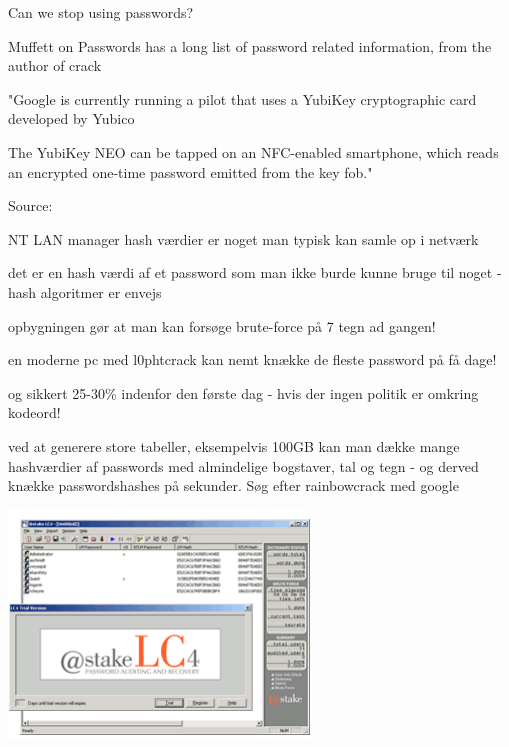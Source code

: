 \documentclass[20pt,landscape,a4paper,footrule]{foils}
\begin{document}


Can we stop using passwords?

Muffett on Passwords has a long list of password related information, from the author of crack 






"Google is currently running a pilot that uses a YubiKey cryptographic card developed by Yubico

The YubiKey NEO can be tapped on an NFC-enabled smartphone, which reads an encrypted one-time password emitted from the key fob."

Source:\\
{\footnotesize {}
}



\begin{list1}
  \item NT LAN manager hash værdier er noget man typisk kan samle op i
  netværk
\item det er en hash værdi af et password som man ikke burde kunne
  bruge til noget - hash algoritmer er envejs
\item opbygningen gør at man kan forsøge brute-force på 7 tegn ad
  gangen!
\item en moderne pc med l0phtcrack kan nemt knække de fleste password
  på få dage!
\item og sikkert 25-30\% indenfor den første dag - hvis der ingen
  politik er omkring kodeord!
\item ved at generere store tabeller, eksempelvis 100GB kan man dække
  mange hashværdier af passwords med almindelige bogstaver, tal og
  tegn - og derved knække passwordshashes på sekunder. Søg efter
  rainbowcrack med google
\end{list1}

\begin{center}
\colorbox{white}{\includegraphics[width=8cm]{images/lc4_splash.png}}
\end{center}
\end{document}
